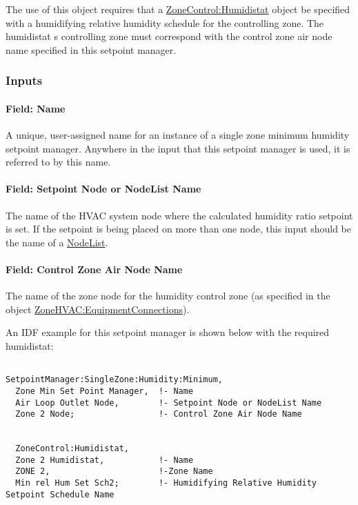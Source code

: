 The use of this object requires that a \hyperref[zonecontrolhumidistat]{ZoneControl:Humidistat} object be specified with a humidifying relative humidity schedule for the controlling zone. The humidistat s controlling zone must correspond with the control zone air node name specified in this setpoint manager.

\subsubsection{Inputs}\label{inputs-6-024}

\paragraph{Field: Name}\label{field-name-6-020}

A unique, user-assigned name for an instance of a single zone minimum humidity setpoint manager. Anywhere in the input that this setpoint manager is used, it is referred to by this name.

\paragraph{Field: Setpoint Node or NodeList Name}\label{field-setpoint-node-or-nodelist-name-6}

The name of the HVAC system node where the calculated humidity ratio setpoint is set. If the setpoint is being placed on more than one node, this input should be the name of a \hyperref[nodelist]{NodeList}.

\paragraph{Field: Control Zone Air Node Name}\label{field-control-zone-air-node-name}

The name of the zone node for the humidity control zone (as specified in the object \hyperref[zonehvacequipmentconnections]{ZoneHVAC:EquipmentConnections}).

An IDF example for this setpoint manager is shown below with the required humidistat:

\begin{lstlisting}

SetpointManager:SingleZone:Humidity:Minimum,
  Zone Min Set Point Manager,  !- Name
  Air Loop Outlet Node,        !- Setpoint Node or NodeList Name
  Zone 2 Node;                 !- Control Zone Air Node Name


  ZoneControl:Humidistat,
  Zone 2 Humidistat,           !- Name
  ZONE 2,                      !-Zone Name
  Min rel Hum Set Sch2;        !- Humidifying Relative Humidity Setpoint Schedule Name
\end{lstlisting}

